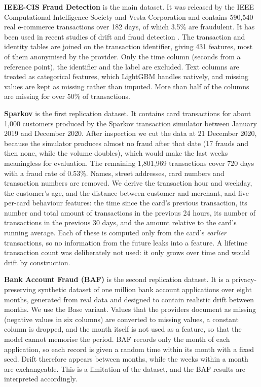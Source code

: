 \textbf{IEEE-CIS Fraud Detection} is the main dataset. It was released by the IEEE Computational Intelligence Society and Vesta Corporation and contains 590,540 real e-commerce transactions over 182 days, of which 3.5\% are fraudulent. It has been used in recent studies of drift and fraud detection \cite{menezes2025,uddin2026}. The transaction and identity tables are joined on the transaction identifier, giving 431 features, most of them anonymised by the provider. Only the time column (seconds from a reference point), the identifier and the label are excluded. Text columns are treated as categorical features, which LightGBM handles natively, and missing values are kept as missing rather than imputed. More than half of the columns are missing for over 50\% of transactions.

\textbf{Sparkov} is the first replication dataset. It contains card transactions for about 1,000 customers produced by the Sparkov transaction simulator between January 2019 and December 2020. After inspection we cut the data at 21 December 2020, because the simulator produces almost no fraud after that date (17 frauds and then none, while the volume doubles), which would make the last weeks meaningless for evaluation. The remaining 1,801,969 transactions cover 720 days with a fraud rate of 0.53\%. Names, street addresses, card numbers and transaction numbers are removed. We derive the transaction hour and weekday, the customer's age, and the distance between customer and merchant, and five per-card behaviour features: the time since the card's previous transaction, its number and total amount of transactions in the previous 24 hours, its number of transactions in the previous 30 days, and the amount relative to the card's running average. Each of these is computed only from the card's \textit{earlier} transactions, so no information from the future leaks into a feature. A lifetime transaction count was deliberately not used: it only grows over time and would drift by construction.

\textbf{Bank Account Fraud (BAF)} is the second replication dataset. It is a privacy-preserving synthetic dataset of one million bank account applications over eight months, generated from real data and designed to contain realistic drift between months. We use the Base variant. Values that the providers document as missing (negative values in six columns) are converted to missing values, a constant column is dropped, and the month itself is not used as a feature, so that the model cannot memorise the period. BAF records only the month of each application, so each record is given a random time within its month with a fixed seed. Drift therefore appears between months, while the weeks within a month are exchangeable. This is a limitation of the dataset, and the BAF results are interpreted accordingly.

